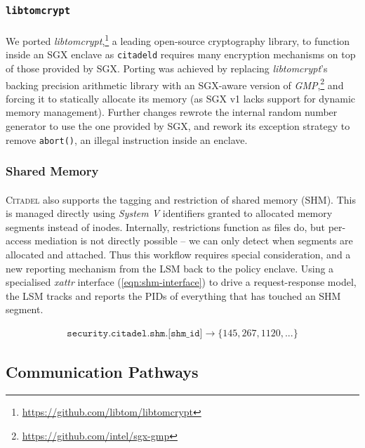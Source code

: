 \subsubsection{\texttt{libtomcrypt}}
\paragraph{} We ported \textit{libtomcrypt},\footnote{\url{https://github.com/libtom/libtomcrypt}} a leading open-source cryptography library, to function inside an SGX enclave as \texttt{citadeld} requires many encryption mechanisms on top of those provided by SGX. Porting was achieved by replacing \textit{libtomcrypt}'s backing precision arithmetic library with an SGX-aware version of \textit{GMP},\footnote{\url{https://github.com/intel/sgx-gmp}} and forcing it to statically allocate its memory (as SGX v1 lacks support for dynamic memory management). Further changes rewrote the internal random number generator to use the one provided by SGX, and rework its exception strategy to remove \texttt{abort()}, an illegal instruction inside an enclave.

\subsubsection{Shared Memory}
\label{sec:shm}
\paragraph{} \textsc{Citadel} also supports the tagging and restriction of shared memory (SHM). This is managed directly using \textit{System V} identifiers granted to allocated memory segments instead of inodes. Internally, restrictions function as files do, but per-access mediation is not directly possible -- we can only detect when segments are allocated and attached. Thus this workflow requires special consideration, and a new reporting mechanism from the LSM back to the policy enclave. Using a specialised \textit{xattr} interface (\ref{eqn:shm-interface}) to drive a request-response model, the LSM tracks and reports the PIDs of everything that has touched an SHM segment. 

\vspace{-8mm}
\begin{align}
    \texttt{security.citadel.shm.[shm\_id]} \longrightarrow \{145, 267, 1120, ...\} \label{eqn:shm-interface}
\end{align}

\subsection{Communication Pathways}
\label{sec:interdomain-comms}
